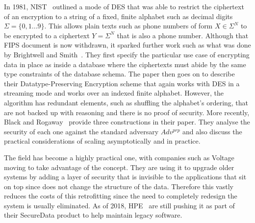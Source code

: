 \documentclass[ %
                    author={Samuel Russell},
                supervisor={Prof. Bogdan Warinschi},
                    degree={MEng},
                     title={Innocuous Ciphertexts},
                  subtitle={The DE-CENSOR Scheme},
                      type={research},
                      year={2018} ]{dissertation}
\begin{document}
In 1981, NIST~\cite{FIPS74} outlined a mode of DES that was able to restrict the ciphertext of an encryption to a string of a fixed, finite alphabet such as decimal digits $ \Sigma = \{0,1...9\} $. This allows plain texts such as phone numbers of form $ X \in \Sigma^N $ to be encrypted to a ciphertext $ Y = \Sigma^N $ that is also a phone number. Although that FIPS document is now withdrawn, it sparked further work such as what was done by Brightwell and Smith~\cite{DPE}. They first specify the particular use case of encrypting data in place as inside a database where the ciphertexts must abide by the same type constraints of the database schema. The paper then goes on to describe their  Datatype-Preserving Encryption scheme that again works with DES in a streaming mode and works over an indexed finite alphabet. However, the algorithm has redundant elements, such as shuffling the alphabet's ordering, that are not backed up with reasoning and there is no proof of security. More recently, Black and Rogaway~\cite{CAFD} provide three constructions in their paper. They analyse the security of each one against the standard adversary $Adv^{prp}$ and also discuss the practical considerations of scaling asymptotically and in practice.

The field has become a highly practical one, with companies such as Voltage moving to take advantage of the concept. They are using it to upgrade older systems by adding a layer of security that is invisible to the applications that sit on top since does not change the structure of the data. Therefore this vastly reduces the costs of this retrofitting since the need to completely redesign the system is usually eliminated. As of 2018, HPE~\cite{hp} are still pushing it as part of their SecureData product to help maintain legacy software.
\end{document}
